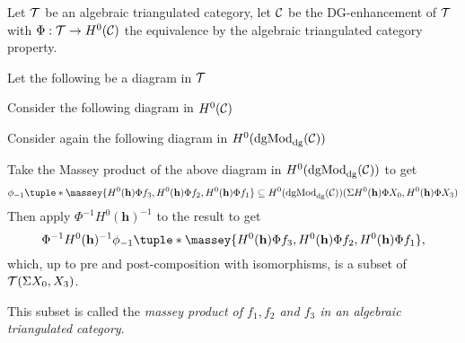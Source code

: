 \begin{definition}
    Let \( {\mathcal{T}} \) be an algebraic triangulated category, let \( {\mathcal{C}} \) be the DG-enhancement of \( {\mathcal{T}} \) with \( \Phi: {\mathcal{T}} \to H^0({\mathcal{C}}) \) the equivalence by the algebraic triangulated category property.
    
    Let the following be a diagram in \( {\mathcal{T}} \)
    \begin{center}
    \end{center}
    Consider the following diagram in \( H^0({\mathcal{C}}) \)
    \begin{center}
    \end{center}
    Consider again the following diagram in \( H^0(\operatorname{dgMod}_{\operatorname{dg}}({\mathcal{C}})) \)
    \begin{center}
    \end{center}
    Take the Massey product of the above diagram in \( H^0(\operatorname{dgMod}_{\operatorname{dg}}({\mathcal{C}})) \) to get
    \[
        \phi_{-1}\tuple*{\massey{H^0(\mathbf{h}) \Phi f_3, H^0(\mathbf{h}) \Phi f_2, H^0(\mathbf{h}) \Phi f_1}} \subseteq H^0(\dgMod_{\dg}(\Cc))(\Sigma H^0(\mathbf{h}) \Phi X_0, H^0(\mathbf{h}) \Phi X_3)
    \]
    Then apply \( \Phi^{-1} H^0(\mathbf{h})^{-1} \) to the result to get
    \[
        \Phi^{-1} H^0(\mathbf{h})^{-1} \phi_{-1}\tuple*{\massey{H^0(\mathbf{h}) \Phi f_3, H^0(\mathbf{h}) \Phi f_2, H^0(\mathbf{h}) \Phi f_1}},
    \]
    which, up to pre and post-composition with isomorphisms, is a subset of \( {\mathcal{T}}(\Sigma X_0, X_3) \).

    This subset is called the \emph{massey product of \( f_1, f_2 \) and \( f_3 \) in an algebraic triangulated category}.
\end{definition}

